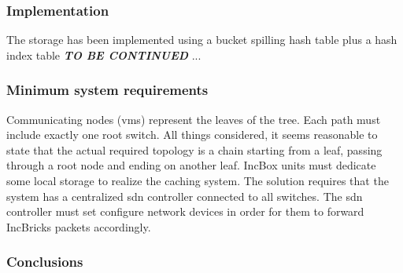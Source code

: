 \subsubsection{Implementation}
The storage has been implemented using a bucket spilling hash table plus a hash index table
\textbf{\textit{TO BE CONTINUED}} ...

\subsubsection{Minimum system requirements}
Communicating nodes (\glspl{vm}) represent the leaves of the tree.
Each path must include exactly one root switch.
All things considered, it seems reasonable to state that the actual required topology is a chain starting from a leaf, passing through a root node and ending on another leaf.
IncBox units must dedicate some local storage to realize the caching system.
The solution requires that the system has a centralized \gls{sdn} controller connected to all switches.
The \gls{sdn} controller must set configure network devices in order for them to forward IncBricks \cite{incbricks} packets accordingly.

\subsubsection{Conclusions}